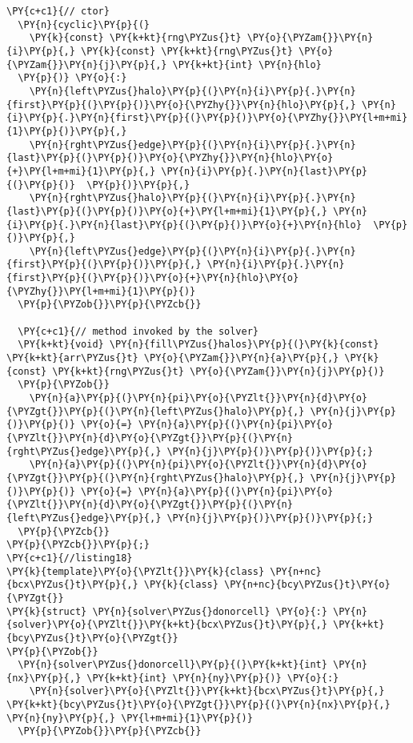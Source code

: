 \begin{Verbatim}[commandchars=\\\{\}]
  \PY{c+c1}{// ctor}
  \PY{n}{cyclic}\PY{p}{(}
    \PY{k}{const} \PY{k+kt}{rng\PYZus{}t} \PY{o}{\PYZam{}}\PY{n}{i}\PY{p}{,} \PY{k}{const} \PY{k+kt}{rng\PYZus{}t} \PY{o}{\PYZam{}}\PY{n}{j}\PY{p}{,} \PY{k+kt}{int} \PY{n}{hlo}
  \PY{p}{)} \PY{o}{:}
    \PY{n}{left\PYZus{}halo}\PY{p}{(}\PY{n}{i}\PY{p}{.}\PY{n}{first}\PY{p}{(}\PY{p}{)}\PY{o}{\PYZhy{}}\PY{n}{hlo}\PY{p}{,} \PY{n}{i}\PY{p}{.}\PY{n}{first}\PY{p}{(}\PY{p}{)}\PY{o}{\PYZhy{}}\PY{l+m+mi}{1}\PY{p}{)}\PY{p}{,}
    \PY{n}{rght\PYZus{}edge}\PY{p}{(}\PY{n}{i}\PY{p}{.}\PY{n}{last}\PY{p}{(}\PY{p}{)}\PY{o}{\PYZhy{}}\PY{n}{hlo}\PY{o}{+}\PY{l+m+mi}{1}\PY{p}{,} \PY{n}{i}\PY{p}{.}\PY{n}{last}\PY{p}{(}\PY{p}{)}  \PY{p}{)}\PY{p}{,}
    \PY{n}{rght\PYZus{}halo}\PY{p}{(}\PY{n}{i}\PY{p}{.}\PY{n}{last}\PY{p}{(}\PY{p}{)}\PY{o}{+}\PY{l+m+mi}{1}\PY{p}{,} \PY{n}{i}\PY{p}{.}\PY{n}{last}\PY{p}{(}\PY{p}{)}\PY{o}{+}\PY{n}{hlo}  \PY{p}{)}\PY{p}{,}
    \PY{n}{left\PYZus{}edge}\PY{p}{(}\PY{n}{i}\PY{p}{.}\PY{n}{first}\PY{p}{(}\PY{p}{)}\PY{p}{,} \PY{n}{i}\PY{p}{.}\PY{n}{first}\PY{p}{(}\PY{p}{)}\PY{o}{+}\PY{n}{hlo}\PY{o}{\PYZhy{}}\PY{l+m+mi}{1}\PY{p}{)}
  \PY{p}{\PYZob{}}\PY{p}{\PYZcb{}} 

  \PY{c+c1}{// method invoked by the solver}
  \PY{k+kt}{void} \PY{n}{fill\PYZus{}halos}\PY{p}{(}\PY{k}{const} \PY{k+kt}{arr\PYZus{}t} \PY{o}{\PYZam{}}\PY{n}{a}\PY{p}{,} \PY{k}{const} \PY{k+kt}{rng\PYZus{}t} \PY{o}{\PYZam{}}\PY{n}{j}\PY{p}{)}
  \PY{p}{\PYZob{}}
    \PY{n}{a}\PY{p}{(}\PY{n}{pi}\PY{o}{\PYZlt{}}\PY{n}{d}\PY{o}{\PYZgt{}}\PY{p}{(}\PY{n}{left\PYZus{}halo}\PY{p}{,} \PY{n}{j}\PY{p}{)}\PY{p}{)} \PY{o}{=} \PY{n}{a}\PY{p}{(}\PY{n}{pi}\PY{o}{\PYZlt{}}\PY{n}{d}\PY{o}{\PYZgt{}}\PY{p}{(}\PY{n}{rght\PYZus{}edge}\PY{p}{,} \PY{n}{j}\PY{p}{)}\PY{p}{)}\PY{p}{;}     
    \PY{n}{a}\PY{p}{(}\PY{n}{pi}\PY{o}{\PYZlt{}}\PY{n}{d}\PY{o}{\PYZgt{}}\PY{p}{(}\PY{n}{rght\PYZus{}halo}\PY{p}{,} \PY{n}{j}\PY{p}{)}\PY{p}{)} \PY{o}{=} \PY{n}{a}\PY{p}{(}\PY{n}{pi}\PY{o}{\PYZlt{}}\PY{n}{d}\PY{o}{\PYZgt{}}\PY{p}{(}\PY{n}{left\PYZus{}edge}\PY{p}{,} \PY{n}{j}\PY{p}{)}\PY{p}{)}\PY{p}{;}     
  \PY{p}{\PYZcb{}}
\PY{p}{\PYZcb{}}\PY{p}{;}
\PY{c+c1}{//listing18}
\PY{k}{template}\PY{o}{\PYZlt{}}\PY{k}{class} \PY{n+nc}{bcx\PYZus{}t}\PY{p}{,} \PY{k}{class} \PY{n+nc}{bcy\PYZus{}t}\PY{o}{\PYZgt{}}
\PY{k}{struct} \PY{n}{solver\PYZus{}donorcell} \PY{o}{:} \PY{n}{solver}\PY{o}{\PYZlt{}}\PY{k+kt}{bcx\PYZus{}t}\PY{p}{,} \PY{k+kt}{bcy\PYZus{}t}\PY{o}{\PYZgt{}} 
\PY{p}{\PYZob{}}
  \PY{n}{solver\PYZus{}donorcell}\PY{p}{(}\PY{k+kt}{int} \PY{n}{nx}\PY{p}{,} \PY{k+kt}{int} \PY{n}{ny}\PY{p}{)} \PY{o}{:}
    \PY{n}{solver}\PY{o}{\PYZlt{}}\PY{k+kt}{bcx\PYZus{}t}\PY{p}{,} \PY{k+kt}{bcy\PYZus{}t}\PY{o}{\PYZgt{}}\PY{p}{(}\PY{n}{nx}\PY{p}{,} \PY{n}{ny}\PY{p}{,} \PY{l+m+mi}{1}\PY{p}{)}
  \PY{p}{\PYZob{}}\PY{p}{\PYZcb{}}  


\end{Verbatim}
